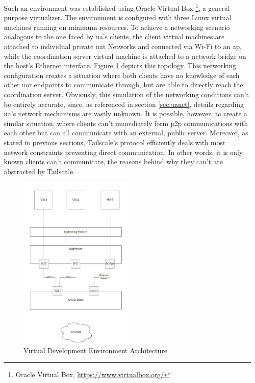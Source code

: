 \documentclass[11pt,twoside,a4paper]{report}
\begin{document}
Such an environment was established using Oracle Virtual Box \footnote{Oracle Virtual Box, \url{https://www.virtualbox.org/}}, a general purpose virtualizer. The environment is configured with three Linux virtual machines running on minimum resources. To achieve a networking scenario analogous to the one faced by \ac{ua}'s clients, the client virtual machines are attached to individual private \ac{nat} Networks and connected via Wi-Fi to an \ac{ap}, while the coordination server virtual machine is attached to a network bridge on the host's Ethernet interface. Figure \ref{fig:sandbox} depicts this topology. This networking configuration creates a situation where both clients have no knowledge of each other nor endpoints to communicate through, but are able to directly reach the coordination server. Obviously, this simulation of the networking conditions can't be entirely accurate, since, as referenced in section \ref{sec:uanet}, details regarding \ac{ua}'s network mechanisms are vastly unknown. It is possible, however, to create a similar situation, where clients can't immediately form \ac{p2p} communications with each other but can all communicate with an external, public server. Moreover, as stated in previous sections, Tailscale's protocol efficiently deals with most network constraints preventing direct communication. In other words, it is only known clients can't communicate, the reasons behind why they can't are abstracted by Tailscale.

\begin{figure}[h]
\centering
\includegraphics[width=0.5\textwidth]{dev.png}
\caption{Virtual Development Environment Architecture}
\label{fig:sandbox}
\end{figure}
\end{document}
